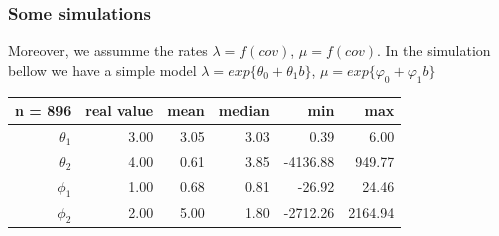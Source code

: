 \documentclass[compress,red]{beamer}
\begin{document}
\begin{frame}[shrink]
 \frametitle{Some simulations}
 
 Moreover, we assumme the rates $\lambda = f(cov)$, $\mu = f(cov)$. In the simulation bellow we have a simple model $ \lambda = exp\{\theta_0 + \theta_1 b\} $, $\mu = exp\{\varphi_0 + \varphi_1 b\} $ 

\begin{table}[ht]
\centering
\begin{tabular}{r|rrrrr}
  \hline
  n = 896 & real value & mean & median & min & max \\ 
  \hline
$\theta_1$  & 3.00 & 3.05 & {\color{blue}3.03} & 0.39 & 6.00 \\ 
  $\theta_2$  & 4.00 & 0.61 & {\color{blue}3.85} & -4136.88 & 949.77 \\ 
  $\phi_1$  & 1.00 & 0.68 & {\color{blue}0.81} & -26.92 & 24.46 \\ 
  $\phi_2$  & 2.00 & 5.00 & {\color{blue}1.80} & -2712.26 & 2164.94 \\ \hline
\end{tabular}
\end{table}


\end{frame}
\end{document}

